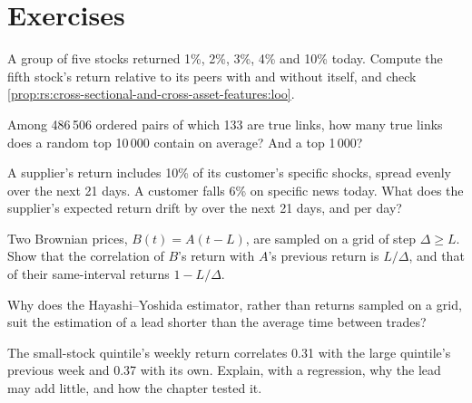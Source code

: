 \section{Exercises}

\begin{exercise}[$\star$]\label{exo:rs:cross-sectional-and-cross-asset-features:1}
A group of five stocks returned 1\%, 2\%, 3\%, 4\% and 10\% today. Compute the fifth stock's return relative to its peers with and
without itself, and check \cref{prop:rs:cross-sectional-and-cross-asset-features:loo}.
\end{exercise}

\begin{exercise}[$\star$]\label{exo:rs:cross-sectional-and-cross-asset-features:2}
Among 486\,506 ordered pairs of which 133 are true links, how many true links does a random top 10\,000 contain on average? And a top
1\,000?
\end{exercise}

\begin{exercise}[$\star$]\label{exo:rs:cross-sectional-and-cross-asset-features:3}
A supplier's return includes 10\% of its customer's specific shocks, spread evenly over the next 21 days. A customer falls 6\% on
specific news today. What does the supplier's expected return drift by over the next 21 days, and per day?
\end{exercise}

\begin{exercise}[$\star\star$]\label{exo:rs:cross-sectional-and-cross-asset-features:4}
Two Brownian prices, $B(t) = A(t - L)$, are sampled on a grid of step $\Delta \ge L$. Show that the correlation of $B$'s return with
$A$'s previous return is $L/\Delta$, and that of their same-interval returns $1 - L/\Delta$.
\end{exercise}

\begin{exercise}[$\star\star$]\label{exo:rs:cross-sectional-and-cross-asset-features:5}
Why does the Hayashi--Yoshida estimator, rather than returns sampled on a grid, suit the estimation of a lead shorter than the average
time between trades?
\end{exercise}

\begin{exercise}[$\star\star$]\label{exo:rs:cross-sectional-and-cross-asset-features:6}
The small-stock quintile's weekly return correlates 0.31 with the large quintile's previous week and 0.37 with its own. Explain, with a
regression, why the lead may add little, and how the chapter tested it.
\end{exercise}

